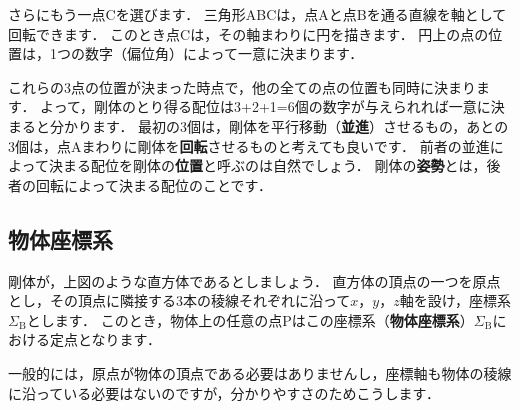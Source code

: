 ﻿\documentclass[a4paper]{jsarticle}
\begin{document}
さらにもう一点Cを選びます．
三角形ABCは，点Aと点Bを通る直線を軸として回転できます．
このとき点Cは，その軸まわりに円を描きます．
円上の点の位置は，1つの数字（偏位角）によって一意に決まります．

これらの3点の位置が決まった時点で，他の全ての点の位置も同時に決まります．
よって，剛体のとり得る配位は3+2+1=6個の数字が与えられれば一意に決まると分かります．
最初の3個は，剛体を平行移動（{\bf 並進}）させるもの，あとの3個は，点Aまわりに剛体を{\bf 回転}させるものと考えても良いです．
前者の並進によって決まる配位を剛体の{\bf 位置}と呼ぶのは自然でしょう．
剛体の{\bf 姿勢}とは，後者の回転によって決まる配位のことです．


\subsection{物体座標系}

\begin{figure*}[h]
\begin{center}

\end{center}
\end{figure*}

剛体が，上図のような直方体であるとしましょう．
直方体の頂点の一つを原点とし，その頂点に隣接する3本の稜線それぞれに沿って$x$，$y$，$z$軸を設け，座標系$\Sigma_{\mathrm{B}}$とします．
このとき，物体上の任意の点Pはこの座標系（{\bf 物体座標系}）$\Sigma_{\mathrm{B}}$における定点となります．

一般的には，原点が物体の頂点である必要はありませんし，座標軸も物体の稜線に沿っている必要はないのですが，分かりやすさのためこうします．
\end{document}
